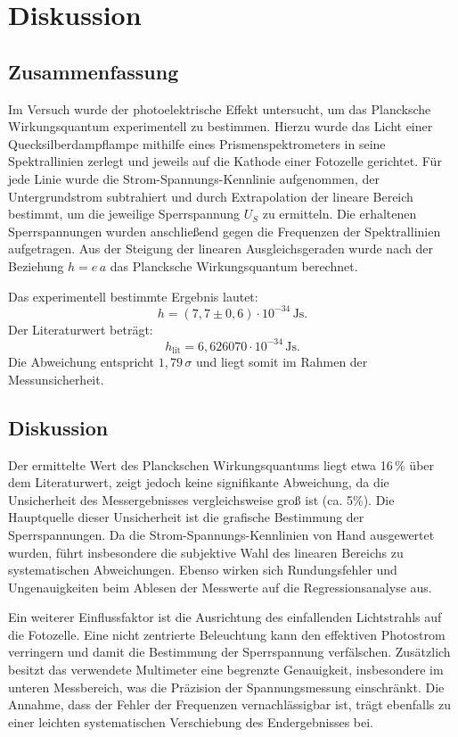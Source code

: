\chapter{Diskussion}

\section{Zusammenfassung}

Im Versuch wurde der photoelektrische Effekt untersucht, um das Plancksche Wirkungsquantum experimentell zu bestimmen.  
Hierzu wurde das Licht einer Quecksilberdampflampe mithilfe eines Prismenspektrometers in seine Spektrallinien zerlegt und jeweils auf die Kathode einer Fotozelle gerichtet.  
Für jede Linie wurde die Strom-Spannungs-Kennlinie aufgenommen, der Untergrundstrom subtrahiert und durch Extrapolation der lineare Bereich bestimmt, um die jeweilige Sperrspannung $U_S$ zu ermitteln.  
Die erhaltenen Sperrspannungen wurden anschließend gegen die Frequenzen der Spektrallinien aufgetragen.  
Aus der Steigung der linearen Ausgleichsgeraden wurde nach der Beziehung $h = e \, a$ das Plancksche Wirkungsquantum berechnet.  

Das experimentell bestimmte Ergebnis lautet:
\[
h = (7{,}7 \pm 0{,}6) \cdot 10^{-34}\,\text{Js}.
\]
Der Literaturwert beträgt:
\[
h_\text{lit} = 6{,}626070 \cdot 10^{-34}\,\text{Js}.
\]
Die Abweichung entspricht $1{,}79\,\sigma$ und liegt somit im Rahmen der Messunsicherheit.

\section{Diskussion}

Der ermittelte Wert des Planckschen Wirkungsquantums liegt etwa 16\,\% über dem Literaturwert, zeigt jedoch keine signifikante Abweichung, da die Unsicherheit des Messergebnisses vergleichsweise groß ist (ca. 5\%).  
Die Hauptquelle dieser Unsicherheit ist die grafische Bestimmung der Sperrspannungen.  
Da die Strom-Spannungs-Kennlinien von Hand ausgewertet wurden, führt insbesondere die subjektive Wahl des linearen Bereichs zu systematischen Abweichungen.  
Ebenso wirken sich Rundungsfehler und Ungenauigkeiten beim Ablesen der Messwerte auf die Regressionsanalyse aus.  

Ein weiterer Einflussfaktor ist die Ausrichtung des einfallenden Lichtstrahls auf die Fotozelle.  
Eine nicht zentrierte Beleuchtung kann den effektiven Photostrom verringern und damit die Bestimmung der Sperrspannung verfälschen.  
Zusätzlich besitzt das verwendete Multimeter eine begrenzte Genauigkeit, insbesondere im unteren Messbereich, was die Präzision der Spannungsmessung einschränkt.  
Die Annahme, dass der Fehler der Frequenzen vernachlässigbar ist, trägt ebenfalls zu einer leichten systematischen Verschiebung des Endergebnisses bei.

